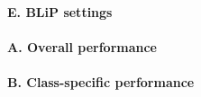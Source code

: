 

\paragraph*{E. BLiP settings}



\paragraph*{A. Overall performance}



\paragraph*{B. Class-specific performance}





\FloatBarrier








